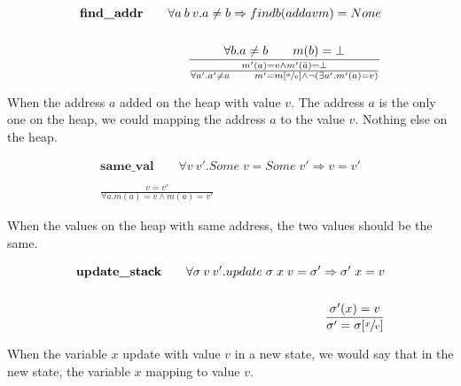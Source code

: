\begin{equation}
\begin{split}
\textbf{find\_addr}\qquad\forall a\:b\:v.a\neq b\Rightarrow find b (add a v m) = None \\ \\
\frac{\forall b.a\neq b \qquad m(b)=\bot}{\frac{m'(a)=v\wedge m'(\bar{a})=\bot}{\forall a'.a'\neq a \qquad m'=m[\sfrac{a}{v}]\wedge\neg(\exists a'.m'(a)=v)}}
\end{split}
\end{equation}

When the address $a$ added on the heap with value $v$. The address $a$ is the only one on the heap, we could mapping the address $a$ to the value $v$. Nothing else on the heap.

\begin{equation}
\begin{split}
\textbf{same\_val}\qquad\forall v\:v'.Some\;v = Some\;v' \Rightarrow v=v' \\ \\
\frac{v=v'}{\forall a.m(a)=v\wedge m(a)=v'}
\end{split}
\end{equation}

When the values on the heap with same address, the two values should be the same.

\begin{equation}
\begin{split}
\textbf{update\_stack}\qquad\forall \sigma\:v\:v'.update\;\sigma\;x\;v=\sigma'\Rightarrow\sigma'\;x=v \\ \\
\frac{\sigma'(x)=v}{\sigma'=\sigma[\sfrac{x}{v}]}
\end{split}
\end{equation}

When the variable $x$ update with value $v$ in a new state, we would say that in the new state, the variable $x$ mapping to value $v$.